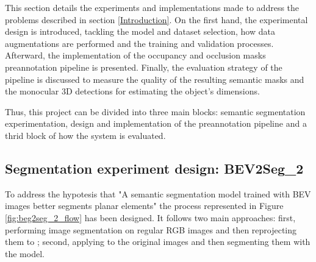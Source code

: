 

This section details the experiments and implementations made to address the problems described in section \ref{Introduction}. On the first hand, the experimental design is introduced, tackling the model and dataset selection, how data augmentations are performed and the training and validation processes. Afterward, the implementation of the occupancy and occlusion masks preannotation pipeline is presented. Finally, the evaluation strategy of the pipeline is discussed to measure the quality of the resulting semantic masks and the monocular 3D detections for estimating the object's dimensions.


Thus, this project can be divided into three main blocks:  semantic segmentation experimentation, design and implementation of the preannotation pipeline and a thrid block of how the system is evaluated.

\subsection{Segmentation experiment design: BEV2Seg\_2}
\label{bev2seg_2}

To address the hypotesis that "A semantic segmentation model trained with BEV images better segments planar elements" the process represented in Figure \ref{fig:beg2seg_2_flow} has been designed. It follows two main approaches: first, performing image segmentation on regular RGB images and then reprojecting them to ; second, applying  to the original images and then segmenting them with the model.

